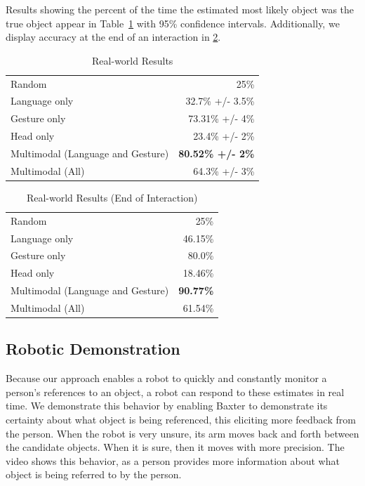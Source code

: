 \documentclass[letterpaper, 10 pt, conference]{ieeeconf}
\begin{document}
Results showing the percent of the time the estimated most likely object was the true object appear in Table~\ref{table:real_results} with 95\% confidence intervals. Additionally, we display accuracy at the end of an interaction in \ref{table:end_real}.
\begin{table}
\caption{Real-world Results\label{table:real_results}}
\centering
\begin{tabular}{lr}
\toprule
Random & 25\%\\
Language only &  32.7\% +/- 3.5\%\\
Gesture only  &  73.31\% +/- 4\%\\
Head only     &  23.4\% +/- 2\%\\
Multimodal (Language and Gesture) & {\bf 80.52\% +/- 2\%}\\
Multimodal (All) &  64.3\% +/- 3\%\\
\bottomrule
\end{tabular}
\end{table}
\begin{table}
\caption{Real-world Results (End of Interaction)\label{table:end_real}}
\centering
\begin{tabular}{lr}
\toprule
Random & 25\%\\
Language only &  46.15\%\\
Gesture only  &  80.0\%\\
Head only     & 18.46\%\\
Multimodal (Language and Gesture) & {\bf 90.77\%}\\
Multimodal (All) &  61.54\%\\
\bottomrule
\end{tabular}
\end{table}

\subsection{Robotic Demonstration}

Because our approach enables a robot to quickly and constantly monitor
a person's references to an object, a robot can respond to these
estimates in real time.  We demonstrate this behavior by enabling
Baxter to demonstrate its certainty about what object is being
referenced, this eliciting more feedback from the person.  When the
robot is very unsure, its arm moves back and forth between the
candidate objects.  When it is sure, then it moves with more
precision.  The video shows this behavior, as a person provides more
information about what object is being referred to by the person.
\end{document}
